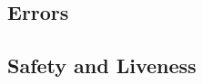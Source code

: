 \subsection{Errors}

\subsection{Safety and Liveness}

% 
% 
% 
% 
% 
% 
% 
% 
% 
% 
% 
% 
% 
% 
% 
% 
